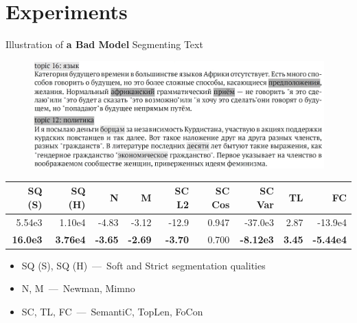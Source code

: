 \documentclass[russian]{beamer}
\begin{document}
\section{Experiments}

\begin{frame}{Illustration of \textbf{a Bad Model} Segmenting Text}
  \begin{figure}[h]
    \centering
    \includegraphics[width=\textwidth]{combine_bad.jpg}
  \end{figure}
  
  \vspace{-0.5cm}

  \begin{table}[h]
    \scriptsize
    \centering
    \begin{tabular}{rrrrrrrrr}
      SQ (S) & SQ (H) & N & M & SC L2 & SC Cos & SC Var & TL & FC\\
      \midrule
      \rowcolor{my-pink}
      5.54e3 & 1.10e4 & -4.83 & -3.12 & -12.9 & 0.947 & -37.0e3 & 2.87 & -13.9e4\\
      \textbf{16.0e3} & \textbf{3.76e4} & \textbf{-3.65} & \textbf{-2.69} & \textbf{-3.70} & 0.700 & \textbf{-8.12e3} & \textbf{3.45} & \textbf{-5.44e4}
    \end{tabular}
  \end{table}
  
  \begin{itemize}\setlength{\itemindent}{0pt}
    \small
    \item SQ (S), SQ (H)~---~Soft and Strict segmentation qualities
    \item N, M~---~Newman, Mimno
    \item SC, TL, FC~---~SemantiC, TopLen, FoCon
  \end{itemize}
\end{frame}
\end{document}
